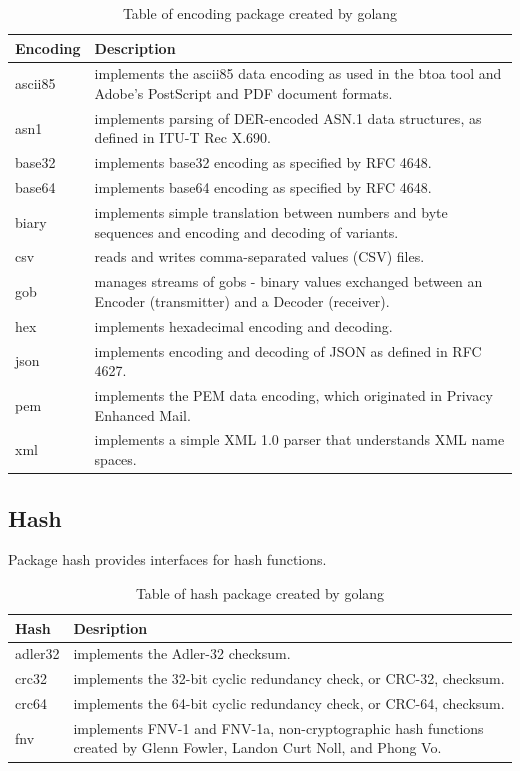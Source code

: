 \documentclass[
  digital, %
  notable,   %
  lof,     %
  lot,     %
]{fithesis3}
\begin{document}
\begin{table}[th]
\begin{tabular}{|p{1.5cm} p{10.5cm}|}
\hline
Encoding & Description \\
\hline
ascii85 & implements the ascii85 data encoding as used in the btoa tool and Adobe's PostScript and PDF document formats. \\
asn1 & implements parsing of DER-encoded ASN.1 data structures, as defined in ITU-T Rec X.690. \\
base32 & implements base32 encoding as specified by RFC 4648. \\
base64 & implements base64 encoding as specified by RFC 4648. \\
biary & implements simple translation between numbers and byte sequences and encoding and decoding of variants. \\
csv & reads and writes comma-separated values (CSV) files. \\
gob & manages streams of gobs - binary values exchanged between an Encoder (transmitter) and a Decoder (receiver). \\
hex & implements hexadecimal encoding and decoding. \\
json & implements encoding and decoding of JSON as defined in RFC 4627. \\
pem & implements the PEM data encoding, which originated in Privacy Enhanced Mail. \\
xml & implements a simple XML 1.0 parser that understands XML name spaces. \\
\hline
\end{tabular}
\caption{Table of encoding package created by golang} 
\label{table:encoding} 
\end{table}

\subsection{Hash}
Package hash provides interfaces for hash functions.

\begin{table}[th]
\begin{tabular}{|p{1.5cm} p{10.5cm}|}
\hline
Hash & Desription \\
\hline
adler32 & implements the Adler-32 checksum. \\
crc32 & implements the 32-bit cyclic redundancy check, or CRC-32, checksum. \\
crc64 & implements the 64-bit cyclic redundancy check, or CRC-64, checksum. \\
fnv & implements FNV-1 and FNV-1a, non-cryptographic hash functions created by Glenn Fowler, Landon Curt Noll, and Phong Vo. \\
\hline
\end{tabular}
\caption{Table of hash package created by golang} 
\label{table:hash} 
\end{table}
\end{document}
